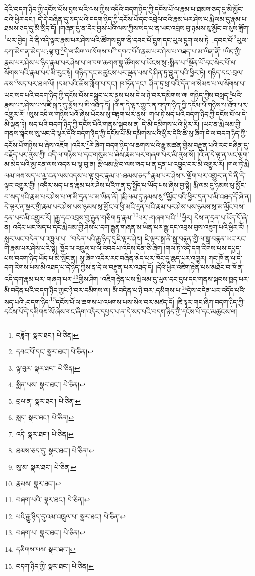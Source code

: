 དེའི་བདག་ཉིད་ཀྱི་དངོས་པོས་བྱས་པའི་ལས་ཀྱིས་འདིའི་བདག་ཉིད་ཀྱི་དངོས་པོ་ལ་རྣམ་པ་ཐམས་ཅད་དུ་མི་མྱོང་བའི་ཕྱིར་དང་། དེ་དེ་བཞིན་དུ་སད་པའི་བདག་ཉིད་ཀྱི་དངོས་པོ་དང་འབྲེལ་བའི་རྣམ་པར་ཤེས་པ་རྨི་ལམ་དུ་རྣམ་པ་ཐམས་ཅད་དུ་མི་སྲིད་དོ། །གཞན་དུ་ན་དེར་བྱས་པའི་ལས་ཀྱིས་སད་པ་ན་ཡང་འབྲས་བུ་ཉམས་སུ་མྱོང་བ་སུས་ཟློག་\footnote{བཟློག་  སྣར་ཐང་།  པེ་ཅིན། }པར་བྱེད། དེ་ནི་འདི་ལྟར་རྣམ་པར་ཤེས་པའི་ཚོགས་དྲུག་ནི་དབང་པོ་དྲུག་དང་ཡུལ་དྲུག་ལས་ཏེ། :དབང་པོ་\footnote{དབང་པོ་དང་  སྣར་ཐང་།  པེ་ཅིན། }ཡུལ་དག་མེད་ན་མེད་པ་:ལྟ་བུ་\footnote{ལྟ་བུར་  སྣར་ཐང་།  པེ་ཅིན། }དེ་ལ་མིག་ལ་སོགས་པའི་དབང་པོའི་རྣམ་པར་ཤེས་པ་འཐད་པ་མ་ཡིན་ནོ། །ཡིད་ཀྱི་རྣམ་པར་ཤེས་པ་ཉིད་རྣམ་པར་ཤེས་པ་ལ་བག་ཆགས་སྣ་ཚོགས་པ་ཡོངས་སུ་:སྨིན་པ་\footnote{སྨིན་པས་  སྣར་ཐང་།  པེ་ཅིན། }སྔོན་པོ་དང་སེར་པོ་ལ་སོགས་པའི་རྣམ་པར་མི་རུང་སྟེ། གཉིད་དང་མཚུངས་པར་ལྡན་པས་དེ་ཤིན་ཏུ་བླུན་པའི་ཕྱིར་ཏེ། གཉིད་དང་:བྲལ་ནས་\footnote{བྲལ་ན་  སྣར་ཐང་།  པེ་ཅིན། }སད་པར་ཐལ་ལོ། །དམ་པའི་ཆོས་ཀློག་པ་དང་། ཁ་ཏོན་དང་། ཤིན་ཏུ་ཕྲ་བའི་དོན་ལ་སེམས་པ་ལ་སོགས་པ་ཡང་སད་པའི་བདག་ཉིད་ཀྱི་དངོས་པོས་བསྒྲུབ་པར་ནུས་པས་དེ་ལ་ཉེ་བར་དམིགས་ལ། གཉིད་ཀྱིས་བསླད་\footnote{སླད་  སྣར་ཐང་།  པེ་ཅིན། }པའི་རྣམ་པར་ཤེས་པ་ལ་ཇི་སྐད་དུ་སྨོས་པ་མི་འཐད་དོ། །འོ་ན་དེ་ལྟར་གྱུར་ན་བདག་ཉིད་ཀྱི་དངོས་པོ་གཉིས་པ་ཐོབ་པར་འགྱུར་རོ། །སུས་འདི་ལ་གཉིས་པའོ་ཞེས་ཡོངས་སུ་བརྟག་པར་ནུས། གལ་ཏེ་སད་པའི་བདག་ཉིད་ཀྱི་དངོས་པོ་ལ་དེ་མི་ལྡན་ཏེ། སད་པའི་བདག་ཉིད་ཀྱི་དངོས་པོའི་གནས་སྐབས་ན། དེ་མི་དམིགས་པའི་ཕྱིར་རོ། །ཡང་ན་རྨི་ལམ་གྱི་གནས་སྐབས་སུ་ཡང་དེ་ལྟར་དེའི་བདག་ཉིད་ཀྱི་དངོས་པོ་མི་དམིགས་པའི་ཕྱིར་དེའི་ཚེ་སུ་ཞིག་དེ་ལ་བདག་ཉིད་ཀྱི་དངོས་པོ་གཉིས་པ་ཞེས་འཇོག །འདིར་\footnote{འདི་  སྣར་ཐང་།  པེ་ཅིན། }རེ་ཞིག་བདག་ཉིད་ལ་ཆགས་པའི་རྒྱུ་མཚན་གྱིས་བརྫུན་པའི་རང་བཞིན་དུ་བརྗོད་པར་ནུས་ཀྱི། འདི་ལ་གཉིས་པ་དང་གསུམ་པ་ཞེས་རྣམ་པར་གཞག་པར་མི་ནུས་སོ། །འོ་ན་དེ་ལྟ་ན་ཡང་ལྷག་མ་མེད་པའི་མྱ་ངན་ལས་འདས་པ་ལྟ་བུ་ན། རྨི་ལམ་རྨི་བ་ལས་སད་པ་ན་དྲན་པ་འབྱུང་བར་མི་འགྱུར་རོ། །གལ་ཏེ་རྨི་ལམ་ལས་སད་པ་མྱ་ངན་ལས་འདས་པ་ལྟ་བུར་རྣམ་པ་:ཐམས་ཅད་\footnote{ཐམས་ཅད་དུ་  སྣར་ཐང་།  པེ་ཅིན། }རྣམ་པར་ཤེས་པ་ལྡོག་པར་འགྱུར་ན་དེ་ནི་དེ་ལྟར་འགྱུར་གྱི། །འདིར་སད་པ་ན་རྣམ་པར་ཤེས་པའི་ཀུན་དུ་སྤྱོད་པ་ཡོད་པས་ཞེས་བྱ་སྟེ། རྨི་ལམ་དུ་ཉམས་སུ་མྱོང་བ་སད་པའི་རྣམ་པར་ཤེས་པ་ལ་མི་དྲན་པ་མ་ཡིན་ནོ། །རྨི་ལམ་དུ་ཉམས་སུ་\footnote{སུ་མ་  སྣར་ཐང་།  པེ་ཅིན། }མྱོང་བའི་ཕྱིར་དྲན་པ་མི་འཐད་དོ་ཞེ་ན། དེ་ལྟར་ན་སྔར་གྱི་རྣམ་པར་ཤེས་པས་ཉམས་སུ་མྱོང་བ་ཕྱི་མའི་དྲན་པའི་རྣམ་པར་ཤེས་པས་ཉམས་སུ་མ་མྱོང་བས་དྲན་པར་མི་འགྱུར་རོ། །རྒྱུ་དང་འབྲས་བུ་རྒྱུན་གཅིག་ཏུ་རྣམ་\footnote{རྣམས་  སྣར་ཐང་། }པར་:གཞག་པའི་\footnote{བཞག་པའི་  སྣར་ཐང་།  པེ་ཅིན། }ཕྱིར། དེས་ན་དྲན་པ་ཡོད་དོ་ཞེ་ན། འདིར་ཡང་སད་པ་དང་རྨི་ལམ་གྱི་ཤེས་པ་དག་རྒྱུན་གཞན་མ་ཡིན་པར་རྒྱུ་དང་འབྲས་བུས་འཇུག་པའི་ཕྱིར་རོ། །སླར་ཡང་བདེན་པ་འཁྲུལ་པ་\footnote{པའི་རྒྱུ་ཉིད་དུ་འམ་འཁྲུལ་པ་  སྣར་ཐང་།  པེ་ཅིན། }བདེན་པའི་རྒྱུ་ཉིད་དུ་ཇི་ལྟར་ཤེས། ཇི་ལྟར་སྒྲ་ནི་སྒྲ་བརྙན་གྱི་ལ་སྒྲ་བརྙན་ཡང་རང་གི་རྣམ་པར་ཤེས་པའི་སྟེ། ཁྱོད་ལ་འཁྲུལ་པ་ལ་འབད་པ་འདིས་དོན་ཅི་ཞིག །གལ་ཏེ་འདི་དག་རིགས་པས་དཔྱད་པས་བདག་ཉིད་ཡོད་པ་མི་སྤོང་ན། སུ་ཞིག་འདིར་རང་བཞིན་མེད་པར་ཁོང་དུ་ཆུད་པར་འགྱུར། གང་ཁོ་ན་ལ་དེ་དག་རིགས་པས་མི་འཐད་པ་དེ་ཉིད་ཀྱིས་ན་དེ་ལ་བརྫུན་པར་འཐད་དོ། །དེའི་ཕྱིར་འཇིག་རྟེན་པས་མཐོང་བ་ཁོ་ན་འདི་དག་རྣམ་པར་:གཞག་པར་\footnote{བཞག་པ་  སྣར་ཐང་།  པེ་ཅིན། }གྱིས་ཤིག །འཇིག་རྟེན་པས་རྨི་ལམ་དུ་ཡུལ་དང་དུས་དང་གནས་སྐབས་ཁྱད་པར་མི་བདེན་པའི་བདག་ཉིད་ཀྱང་ཉེ་བར་དམིགས་ལ། མི་བདེན་པ་ཉེ་བར་:དམིགས་པ་\footnote{དམིགས་པས་  སྣར་ཐང་། }དེས་བདེན་པར་འདོད་པའི་སད་པའི་:བདག་ཉིད་\footnote{བདག་ཉིད་ཀྱི་  སྣར་ཐང་།  པེ་ཅིན། }དངོས་པོ་ལ་ཆགས་པ་འཕགས་པས་སེལ་བར་མཛད་དོ། །ཇི་ལྟར་གང་ཞིག་བདག་ཉིད་ཀྱི་དངོས་པོ་དེ་དམིགས་སོ་ཞེས་གང་ཞིག་འདིར་དཔྱད་པ་ན་དེ་སད་པའི་བདག་ཉིད་ཀྱི་དངོས་པོ་དང་མཚུངས་ལ། 